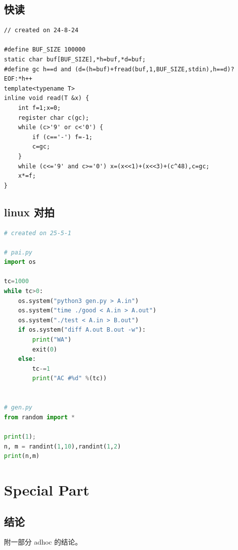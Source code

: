 \documentclass[a4paper,12pt]{article}
\begin{document}
\subsection{快读}

\begin{lstlisting}
// created on 24-8-24

#define BUF_SIZE 100000
static char buf[BUF_SIZE],*h=buf,*d=buf;
#define gc h==d and (d=(h=buf)+fread(buf,1,BUF_SIZE,stdin),h==d)?EOF:*h++
template<typename T>
inline void read(T &x) {
    int f=1;x=0;
    register char c(gc);
    while (c>'9' or c<'0') {
        if (c=='-') f=-1;
        c=gc;
    }
    while (c<='9' and c>='0') x=(x<<1)+(x<<3)+(c^48),c=gc;
    x*=f;
}
\end{lstlisting}

\subsection{linux 对拍}

\begin{lstlisting}[language=Python]
# created on 25-5-1

# pai.py
import os

tc=1000
while tc>0:
    os.system("python3 gen.py > A.in")
    os.system("time ./good < A.in > A.out")
    os.system("./test < A.in > B.out")
    if os.system("diff A.out B.out -w"):
        print("WA")
        exit(0)
    else:
        tc-=1
        print("AC #%d" %(tc))


# gen.py
from random import *

print(1);
n, m = randint(1,10),randint(1,2)
print(n,m)  
\end{lstlisting}

\newpage

\section{Special Part}

\subsection{结论}

\noindent 附一部分 adhoc 的结论。
\end{document}
